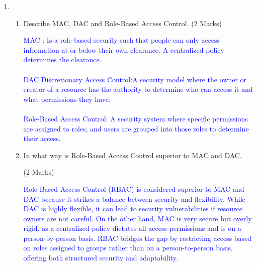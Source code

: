 \documentclass[12pt]{article} \pagestyle{plain}
\begin{document}
  \begin{enumerate}
    \item \begin{enumerate} \item  Describe MAC, DAC and Role-Based Access Control. \hfill (2 Marks)

    \textcolor{blue}{MAC : Is a role-based security such that people can only access information at or below their own clearance. A centralized policy determines the clearance.}\\ \\
     
     \textcolor{blue}{DAC Discretionary Access Control:A security model where the owner or creator of a resource has the authority to determine who can access it and what permissions they have.}\\ \\

     \textcolor{blue}{Role-Based Access Control: A security system where specific permissions are assigned to roles, and users are grouped into those roles to determine their access.} \\   

   \item In what way is Role-Based Access Control superior to MAC and DAC.
   
        \hfill (2 Marks)

    \textcolor{blue}{Role-Based Access Control (RBAC) is considered superior to MAC and DAC because it strikes a balance between security and flexibility. While DAC is highly flexible, it can lead to security vulnerabilities if resource owners are not careful. On the other hand, MAC is very secure but overly rigid, as a centralized policy dictates all access permissions and is on a person-by-person basis. RBAC bridges the gap by restricting access based on roles assigned to groups rather than on a person-to-person basis, offering both structured security and adaptability.}

\end{enumerate}


 \end{enumerate}
 
 
\end{document}
